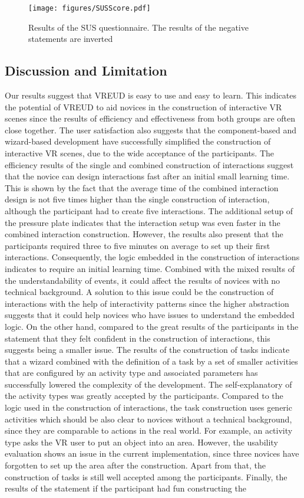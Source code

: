\documentclass[conference]{IEEEtran}
\begin{document}
\begin{figure*}[htbp]
\centerline{\texttt{[image: figures/SUSScore.pdf]}}
\caption{Results of the SUS questionnaire. The results of the negative statements are inverted}
\label{SUS}
\end{figure*}

\subsection{Discussion and Limitation}
Our results suggest that VREUD is easy to use and easy to learn. This indicates the potential of VREUD to aid novices in the construction of interactive \ac{VR} scenes since the results of efficiency and effectiveness from both groups are often close together. The user satisfaction also suggests that the component-based and wizard-based development have successfully simplified the construction of interactive \ac{VR} scenes, due to the wide acceptance of the participants. The efficiency results of the single and combined construction of interactions suggest that the novice can design interactions fast after an initial small learning time. This is shown by the fact that the average time of the combined interaction design is not five times higher than the single construction of interaction, although the participant had to create five interactions. The additional setup of the pressure plate indicates that the interaction setup was even faster in the combined interaction construction. However, the results also present that the participants required three to five minutes on average to set up their first interactions. Consequently, the logic embedded in the construction of interactions indicates to require an initial learning time. Combined with the mixed results of the understandability of events, it could affect the results of novices with no technical background. A solution to this issue could be the construction of interactions with the help of interactivity patterns since the higher abstraction suggests that it could help novices who have issues to understand the embedded logic. On the other hand, compared to the great results of the participants in the statement that they felt confident in the construction of interactions, this suggests being a smaller issue. The results of the construction of tasks indicate that a wizard combined with the definition of a task by a set of smaller activities that are configured by an activity type and associated parameters has successfully lowered the complexity of the development. The self-explanatory of the activity types was greatly accepted by the participants. Compared to the logic used in the construction of interactions, the task construction uses generic activities which should be also clear to novices without a technical background, since they are comparable to actions in the real world. For example, an activity type asks the \ac{VR} user to put an object into an area. However, the usability evaluation shows an issue in the current implementation, since three novices have forgotten to set up the area after the construction. Apart from that, the construction of tasks is still well accepted among the participants. Finally, the results of the statement if the participant had fun constructing the 
\end{document}
